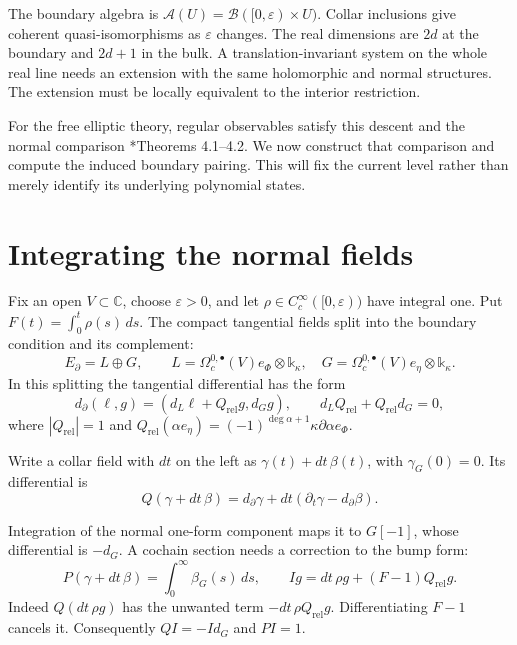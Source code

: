 The\label{pcsm:def:boundary-algebra} boundary algebra is \(\mathcal A(U)=
\mathcal B([0,\varepsilon)\times U)\). Collar inclusions give
coherent quasi-isomorphisms as \(\varepsilon\) changes.
The real dimensions are \(2d\) at the boundary and \(2d+1\) in
the bulk. A translation-invariant system on the whole real line needs an
extension with the same holomorphic and normal structures.
The extension must be locally equivalent to the interior restriction.

For the free elliptic theory, regular observables satisfy this descent
and the normal comparison
\cite{pcsm:GRW}*{Theorems 4.1--4.2}.
We now construct that comparison and compute the induced boundary
pairing. This will fix the current level rather than merely identify
its underlying polynomial states.

\section{Integrating the normal fields}

Fix\label{pcsm:def:collar-profile} an open \(V\subset\mathbb C\), choose \(\varepsilon>0\),
and let \(\rho\in C_c^\infty([0,\varepsilon))\) have integral one.
Put \(F(t)=\int_0^t\rho(s)\,ds\).
The compact tangential fields split into the boundary condition and
its complement:
\[
 E_\partial=L\oplus G,\qquad
 L=\Omega_c^{0,\bullet}(V)e_\Phi\otimes\mathbb k_\kappa,
 \quad G=\Omega_c^{0,\bullet}(V)e_\eta\otimes\mathbb k_\kappa.
\]
In\label{pcsm:def:collar-splitting} this splitting the tangential differential has the form
\[
 d_\partial(\ell,g)=(d_L\ell+Q_{\mathrm{rel}}g,d_Gg),
 \qquad d_LQ_{\mathrm{rel}}+Q_{\mathrm{rel}}d_G=0,
\]
where \(|Q_{\mathrm{rel}}|=1\) and
\(Q_{\mathrm{rel}}(\alpha e_\eta)=
(-1)^{\deg\alpha+1}\kappa\partial\alpha e_\Phi\).

Write a collar field with \(dt\) on the left as
\(\gamma(t)+dt\,\beta(t)\), with \(\gamma_G(0)=0\).
Its differential is
\[
 Q(\gamma+dt\,\beta)=d_\partial\gamma
                +dt(\partial_t\gamma-d_\partial\beta).
\]

Integration of the normal one-form component maps it to \(G[-1]\),
whose differential is \(-d_G\).
A cochain section needs a correction to the bump form:
\begin{equation}\label{pcsm:normalI}
 P(\gamma+dt\,\beta)=\int_0^\infty\beta_G(s)\,ds,
 \qquad Ig=dt\,\rho g+(F-1)Q_{\mathrm{rel}}g.
\end{equation}
Indeed \(Q(dt\,\rho g)\) has the unwanted term
\(-dt\,\rho Q_{\mathrm{rel}}g\). Differentiating \(F-1\)
cancels it. Consequently \(QI=-Id_G\) and \(PI=1\).

